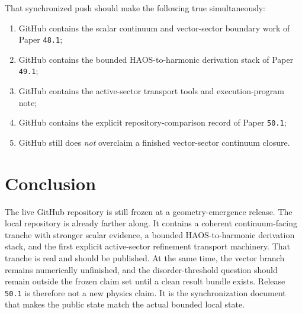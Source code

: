 \documentclass[11pt]{article}
\begin{document}
That synchronized push should make the following true simultaneously:
\begin{enumerate}
\item GitHub contains the scalar continuum and vector-sector boundary work of Paper \texttt{48.1};
\item GitHub contains the bounded HAOS-to-harmonic derivation stack of Paper \texttt{49.1};
\item GitHub contains the active-sector transport tools and execution-program note;
\item GitHub contains the explicit repository-comparison record of Paper \texttt{50.1};
\item GitHub still does \emph{not} overclaim a finished vector-sector continuum closure.
\end{enumerate}

\section{Conclusion}

The live GitHub repository is still frozen at a geometry-emergence release. The local repository is already farther along. It contains a coherent continuum-facing tranche with stronger scalar evidence, a bounded HAOS-to-harmonic derivation stack, and the first explicit active-sector refinement transport machinery. That tranche is real and should be published. At the same time, the vector branch remains numerically unfinished, and the disorder-threshold question should remain outside the frozen claim set until a clean result bundle exists. Release \texttt{50.1} is therefore not a new physics claim. It is the synchronization document that makes the public state match the actual bounded local state.
\end{document}
